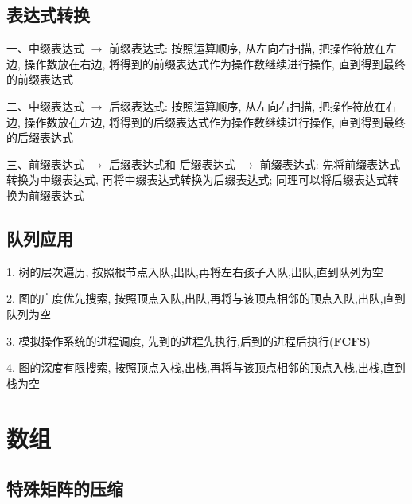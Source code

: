\subsection{表达式转换}
\begin{theorem}[表达式转换: 手算]
    一、中缀表达式 $\to$ 前缀表达式: 按照运算顺序, 从左向右扫描, 把操作符放在左边, 操作数放在右边, 将得到的前缀表达式作为操作数继续进行操作, 直到得到最终的前缀表达式

    二、中缀表达式 $\to$ 后缀表达式: 按照运算顺序, 从左向右扫描, 把操作符放在右边, 操作数放在左边, 将得到的后缀表达式作为操作数继续进行操作, 直到得到最终的后缀表达式

    三、前缀表达式 $\to$ 后缀表达式和 后缀表达式 $\to$ 前缀表达式: 先将前缀表达式转换为中缀表达式, 再将中缀表达式转换为后缀表达式; 同理可以将后缀表达式转换为前缀表达式

\end{theorem}
\subsection{队列应用}
\begin{definition}[队列应用]
    1. 树的层次遍历, 按照根节点入队,出队,再将左右孩子入队,出队,直到队列为空

    2. 图的广度优先搜索, 按照顶点入队,出队,再将与该顶点相邻的顶点入队,出队,直到队列为空

    3. 模拟操作系统的进程调度, 先到的进程先执行,后到的进程后执行($\mathbf{FCFS}$)

    4. 图的深度有限搜索, 按照顶点入栈,出栈,再将与该顶点相邻的顶点入栈,出栈,直到栈为空
\end{definition}

\section{数组}
\begin{definition}[数组]
    
\end{definition}
\subsection{特殊矩阵的压缩}
